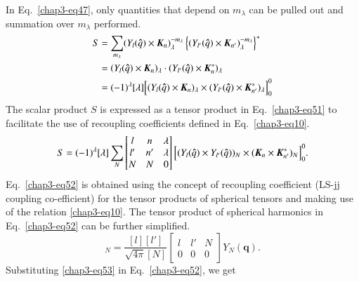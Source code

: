 In Eq.\ \eqref{chap3-eq47},  only quantities that depend on $m_\lambda$ can be pulled out and summation over $m_\lambda$ performed.
\begin{align}
  S & = \sum_{m_\lambda} (Y_l ({\boldsymbol \hat{q}}) \times {\boldsymbol K}_n)_\lambda^{-m_\lambda}
  \left\{ (Y_{l'} ({\boldsymbol \hat{q}}) \times {\boldsymbol K}_{n'})_\lambda^{-m_\lambda}\right\}^\ast \notag \\
  & = (Y_l ({\boldsymbol \hat{q}}) \times {\boldsymbol K}_n)_\lambda \cdot (Y_{l'}({\boldsymbol \hat{q}}) \times {\boldsymbol K}_n^\ast)_\lambda \notag\\
  & = (-1)^\lambda [\lambda] \Bigl[(Y_l ({\boldsymbol \hat{q}}) \times  {\boldsymbol K}_n)_\lambda \times (Y_{l'}({\boldsymbol \hat{q}}) \times {\boldsymbol K}_{n'}^{\ast})_\lambda \Bigr]_0^0 \label{chap3-eq51}
\end{align}
The scalar product $S$ is expressed as a tensor product in Eq.\ \eqref{chap3-eq51} to facilitate the use of recoupling coefficients defined in Eq.\ \eqref{chap3-eq10}.
\begin{equation}
  S= (-1)^\lambda [\lambda] \sum_{N} \begin{bmatrix} l & n & \lambda \\ l' & n' & \lambda\\ N & N & 0\end{bmatrix}
    \Bigl[(Y_l ({\boldsymbol \hat{q}}) \times Y_{l'}({\boldsymbol \hat{q}}))_N \times ({\boldsymbol K}_n \times {\boldsymbol K}_{n'}^\ast)_N\Bigr]_0^0. \label{chap3-eq52}
\end{equation}
Eq.\ \eqref{chap3-eq52} is obtained using the concept of recoupling coefficient (LS-jj coupling co-efficient) for the tensor products of spherical tensors and making use of the relation \eqref{chap3-eq10}. The tensor product of spherical harmonics in Eq.\ \eqref{chap3-eq52} can be further simplified.
\begin{equation}
  [Y_l({\boldsymbol \hat{q}}) \times Y_{l'}({\boldsymbol \hat{q}})]_N = \frac{[l][l']}{\sqrt{4\pi}[N]}
  \begin{bmatrix}l & l' & N\\ 0 & 0 & 0  \end{bmatrix} Y_N ({\boldsymbol q}). \label{chap3-eq53}
\end{equation}
Substituting \eqref{chap3-eq53} in Eq.\ \eqref{chap3-eq52}, we get
